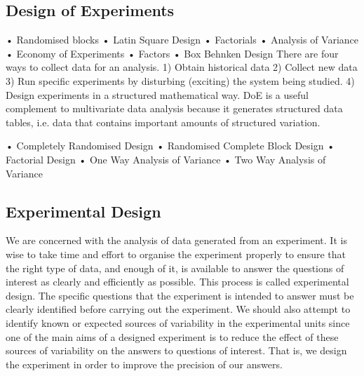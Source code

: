 \subsection*{Design of Experiments}
•	Randomised blocks
•	Latin Square Design
•	Factorials
•	Analysis of Variance
•	Economy of Experiments
•	Factors
•	Box Behnken Design
There are four ways to collect data for an analysis.
1)	Obtain historical data
2)	Collect new data
3)	Run specific experiments by disturbing (exciting) the system being studied.
4)	Design experiments in a structured mathematical way.
DoE is a useful complement to multivariate data analysis because it generates  structured data tables, i.e. data that contains important amounts of structured variation.

•	Completely Randomised Design
•	Randomised Complete Block Design
•	Factorial Design
•	One Way Analysis of Variance
•	Two Way Analysis of Variance
\subsection{Experimental Design}
We are concerned with the analysis of data generated from an experiment. It is wise to take time and effort to organise the experiment properly to ensure that the right type of data, and enough of it, is available to answer the questions of interest as clearly and efficiently as possible. This process is called experimental design.
The specific questions that the experiment is intended to answer must be clearly identified before carrying out the experiment. We should also attempt to identify known or expected sources of variability in the experimental units since one of the main aims of a designed experiment is to reduce the effect of these sources of variability on the answers to questions of interest. That is, we design the experiment in order to improve the precision of our answers.
